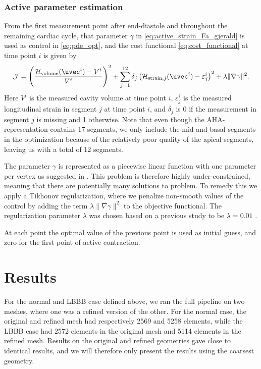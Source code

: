 \subsubsection{Active parameter estimation}
\label{sec:active_param_estim}
From the first measurement point after end-diastole and throughout the
remaining cardiac cycle, that parameter $\gamma$ in
\eqref{eq:active_strain_Fa_gjerald} is used as control in
\eqref{eq:pde_opt}, and the cost functional \eqref{eq:cost_functional}
at time point $i$ is given by 
\begin{align}
  \mathcal{J} =
   \left(\frac{\mathcal{H}_{\mathrm{volume}}(\uvec^i)
  - V^i}{V^i} \right)^2 +
  \sum_{j=1}^{12} \delta_j \left( \mathcal{H}_{\mathrm{strain}, j}(\uvec^i)
  - \varepsilon_{j}^i \right)^2  + \lambda \| \nabla \gamma \|^2.
\end{align}
Here $V^i$ is the measured cavity volume at time point $i$, 
$\varepsilon_{j}^i$ is the measured longitudinal strain in segment $j$
at time point $i$, and $\delta_j$ is 0 if the measurement in segment
$j$ is missing and 1 otherwise. Note that even though the  
AHA-representation \cite{cerqueira2002standardized} contains 17
segments, we only include the mid and basal segments in the
optimization because of the relatively poor quality of the apical
segments, leaving us with a total of 12 segments.

The parameter $\gamma$ is represented as a piecewise linear function
with one parameter per vertex as suggested in \cite{balaban2017high}.
This problem is therefore highly under-constrained, meaning that there
are potentially many solutions to problem. To remedy this we apply a
Tikhonov regularization, where we penalize non-smooth values of the
control by adding the term $\lambda \| \nabla \gamma \|^2$ to the
objective functional. The regularization parameter $\lambda$
was chosen based on a previous study to be $\lambda=0.01$ \cite{balaban2017high}.

At each point the optimal value of the previous point is used as
initial guess, and zero for the first point of active contraction.


\section{Results}
For the normal and LBBB case defined above, we ran the
full pipeline on two meshes, where one was a refined version of the
other. For the normal case, the original and refined mesh had
respectively 2569 and 5258 elements, while the LBBB case
had 2572 elements in the original mesh and 5114 elements in the
refined mesh. Results on the original and refined geometries gave
close to identical results, and we will therefore only present the
results using the coarsest geometry. 

